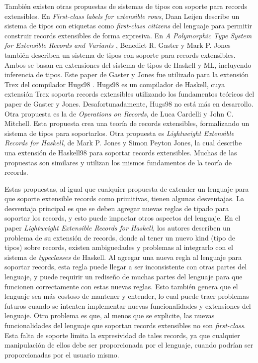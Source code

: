 También existen otras propuestas de sistemas de tipos con soporte para records extensibles. En \textit{First-class labels for extensible rows}\cite{Leijen:fclabels}, Daan Leijen describe un sistema de tipos con etiquetas como \textit{first-class citizens} del lenguaje para permitir construir records extensibles de forma expresiva. En \textit{A Polymorphic Type System for Extensible Records and Variants} \cite{Gaster96apolymorphic}, Benedict R. Gaster y Mark P. Jones también describen un sistema de tipos  con soporte para records extensibles. Ambos se basan en extensiones del sistema de tipos de Haskell y ML, incluyendo inferencia de tipos. Este paper de Gaster y Jones fue utilizado para la extensión Trex del compilador Hugs98 \cite{TrexHugsExtension}. Hugs98 es un compilador de Haskell, cuya extensión Trex soporta records extensibles utilizando los fundamentos teóricos del paper de Gaster y Jones. Desafortunadamente, Hugs98 no está más en desarrollo.
Otra propuesta es la de \textit{Operations on Records}\cite{Cardelli:1990:OR:101514.101515}, de Luca Cardelli y John C. Mitchell. Esta propuesta crea una teoría de records extensibles, formalizando un sistema de tipos para soportarlos. Otra propuesta  es \textit{Lightweight Extensible Records for Haskell}\cite{Jones99lightweightextensible}, de Mark P. Jones y Simon Peyton Jones, la cual describe una extensión de Haskell98 para soportar records extensibles. Muchas de las propuestas son similares y utilizan los mismos fundamentos de la teoría de records.

Estas propuestas, al igual que cualquier propuesta de extender un lenguaje para que soporte extensible records como primitivas, tienen algunas desventajas. La desventaja principal es que se deben agregar nuevas reglas de tipado para soportar los records, y esto puede impactar otros aspectos del lenguaje. En el paper \textit{Lightweight Extensible Records for Haskell}\cite{Jones99lightweightextensible}, los autores describen un problema de su extensión de records, donde al tener un nuevo kind (tipo de tipos) sobre records, existen ambiguedades y problemas al integrarlo con el sistema de \textit{typeclasses} de Haskell. Al agregar una nueva regla al lenguaje para soportar records, esta regla puede llegar a ser inconsistente con otras partes del lenguaje, y puede requirir un rediseño de muchas partes del lenguaje para que funcionen correctamente con estas nuevas reglas. Esto también genera que el lenguaje sea más costoso de mantener y entender, lo cual puede traer problemas futuros cuando se intenten implementar nuevas funcionalidades y extensiones del lenguaje. Otro problema es que, al menos que se explicite, las nuevas funcionalidades del lenguaje que soportan records extensibles no son \textit{first-class}. Esta falta de soporte limita la expresividad de tales records, ya que cualquier manipulación de ellos debe ser proporcionada por el lenguaje, cuando podrían ser proporcionadas por el usuario mismo.

